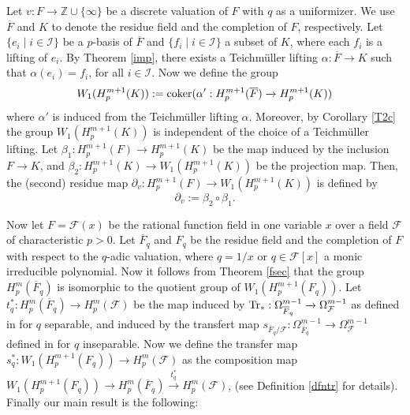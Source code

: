 \documentclass[times,10pt]{amsart}
\newcommand{\Z}{\ensuremath{\mathbb{Z}}}
\newcommand{\F}{\ensuremath{\mathcal{F}}}
\newcommand{\I}{\ensuremath{\mathcal{I}}}
\newcommand{\n}{\ensuremath{\infty}}
\begin{document}
    
    Let    $v: F\xrightarrow{} \Z\cup\{\n\}$ be a discrete valuation of $F$ with $q$ as a uniformizer. We use $\overline{F}$ and $K$ to denote the  residue field  and the completion  of $F$, respectively. Let $ \{ e_i\mid i\in \I\}$ be a $p$-basis of $\overline{F}$ and $ \{ f_i \mid i\in \I\}$ a subset of $ K$, where  each $f_i$ is a lifting of $e_i$.  By Theorem  \ref{imp},   there exists a  Teichm\"uller lifting $\alpha: \overline{F}\xrightarrow{} K$ such that $ \alpha(e_i)=f_i$, for all $i\in \I$.  Now we define the group $$ W_1(H_p^{m+1}(K)):= {\rm coker} ( \alpha': H_p^{m+1}( \overline{F})\xrightarrow{} H_p^{m+1}(K))$$ where $\alpha'$ is  induced from the Teichm\"uller lifting $\alpha$.  Moreover, by  Corollary \ref{T2c}  the group $ W_1(H_p^{m+1}(K))$ is independent of the choice of a Teichm\"uller lifting. Let $ \beta_1: H_p^{m+1}( {F})\xrightarrow{} H_p^{m+1}(K)$ be the map induced by the inclusion $ {F}\xrightarrow{} K$, and $ \beta_2: H_p^{m+1}( K)\xrightarrow{}  W_1(H_p^{m+1}(K))$ be the projection map. Then, the {(second)} residue map $\partial_v: H_p^{m+1}({F})\xrightarrow{} W_1(H_p^{m+1}(K))$ is defined by $$\partial_v := \beta_2\circ \beta_1.$$ 
    
Now let {$F=\F(x)$ be the  rational function field in one variable $x$} over a field $\F$ of characteristic $p>0$.   Let $\overline{F}_q$ and $F_q$ be the residue field and the completion of $F$ with respect to the $q$-adic valuation, where $q=1/x$ or $q\in \F[x]$ a monic irreducible polynomial. Now it follows from Theorem \ref{fsec} that    the group $H_p^m(\overline{F}_q)$ is isomorphic to   the quotient group of $W_1(H_p^{m+1}(F_q))$. Let $t_q^*: H_p^{m}(\overline{F}_q)\xrightarrow{} H_p^m(\F)$ be the map  {induced by}  ${\rm Tr_*}: \Omega^{m-1}_{\overline{F}_q}\xrightarrow{}\Omega^{m-1}_{\F}$  as defined in \cite[Corollary 2.9]{AAB} for $q$ separable, and induced by the transfert map $s_{\overline{F}_q/\F}: \Omega_{\overline{F}_q}^{m-1}\xrightarrow{} \Omega_{\F}^{m-1}$  defined in \cite{ALO} for $q$ inseparable. Now we define the transfer map $ s_q^*: W_1(H_p^{m+1}(F_q))\xrightarrow{} H_p^{m}(\F)$   as the composition  map $ W_1(H_p^{m+1}(F_q))\xrightarrow{} H_p^m(\overline{F}_q)\xrightarrow{t_q^*}  H_p^m(\F)$, (see Definition \ref{dfntr} for details).
     Finally our main result 
is the following:
\medskip
\end{document}
